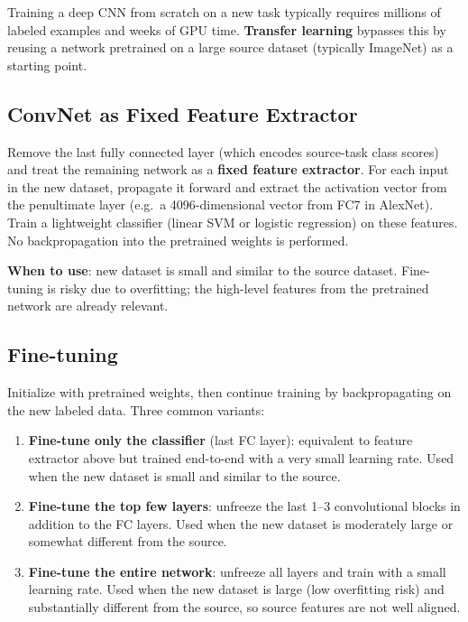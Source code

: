 \documentclass[11pt,a4paper]{article}
\theoremstyle{definition}
\theoremstyle{plain}
\theoremstyle{remark}
\begin{document}
Training a deep CNN from scratch on a new task typically requires millions of labeled examples and weeks of GPU time. \textbf{Transfer learning} bypasses this by reusing a network pretrained on a large source dataset (typically ImageNet) as a starting point.

\subsection{ConvNet as Fixed Feature Extractor}

Remove the last fully connected layer (which encodes source-task class scores) and treat the remaining network as a \textbf{fixed feature extractor}. For each input in the new dataset, propagate it forward and extract the activation vector from the penultimate layer (e.g.\ a 4096-dimensional vector from FC7 in AlexNet). Train a lightweight classifier (linear SVM or logistic regression) on these features. No backpropagation into the pretrained weights is performed.

\textbf{When to use}: new dataset is small and similar to the source dataset. Fine-tuning is risky due to overfitting; the high-level features from the pretrained network are already relevant.

\subsection{Fine-tuning}

Initialize with pretrained weights, then continue training by backpropagating on the new labeled data. Three common variants:

\begin{enumerate}
    \item \textbf{Fine-tune only the classifier} (last FC layer): equivalent to feature extractor above but trained end-to-end with a very small learning rate. Used when the new dataset is small and similar to the source.
    \item \textbf{Fine-tune the top few layers}: unfreeze the last 1--3 convolutional blocks in addition to the FC layers. Used when the new dataset is moderately large or somewhat different from the source.
    \item \textbf{Fine-tune the entire network}: unfreeze all layers and train with a small learning rate. Used when the new dataset is large (low overfitting risk) and substantially different from the source, so source features are not well aligned.
\end{enumerate}
\end{document}
